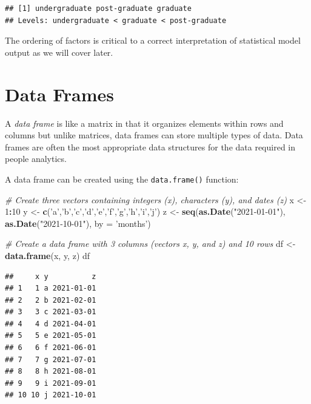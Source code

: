 \documentclass[]{book}
\newenvironment{Shaded}{\begin{snugshade}}{\end{snugshade}}
\newcommand{\CommentTok}[1]{\textcolor[rgb]{0.56,0.35,0.01}{\textit{#1}}}
\newcommand{\DataTypeTok}[1]{\textcolor[rgb]{0.13,0.29,0.53}{#1}}
\newcommand{\DecValTok}[1]{\textcolor[rgb]{0.00,0.00,0.81}{#1}}
\newcommand{\KeywordTok}[1]{\textcolor[rgb]{0.13,0.29,0.53}{\textbf{#1}}}
\newcommand{\NormalTok}[1]{#1}
\newcommand{\OperatorTok}[1]{\textcolor[rgb]{0.81,0.36,0.00}{\textbf{#1}}}
\newcommand{\StringTok}[1]{\textcolor[rgb]{0.31,0.60,0.02}{#1}}
\begin{document}
\begin{verbatim}
## [1] undergraduate post-graduate graduate     
## Levels: undergraduate < graduate < post-graduate
\end{verbatim}

The ordering of factors is critical to a correct interpretation of statistical model output as we will cover later.

\hypertarget{data-frames}{%
\section{Data Frames}\label{data-frames}}

A \emph{data frame} is like a matrix in that it organizes elements within rows and columns but unlike matrices, data frames can store multiple types of data. Data frames are often the most appropriate data structures for the data required in people analytics.

A data frame can be created using the \texttt{data.frame()} function:

\begin{Shaded}
\begin{Highlighting}[]
\CommentTok{# Create three vectors containing integers (x), characters (y), and dates (z)}
\NormalTok{x <-}\StringTok{ }\DecValTok{1}\OperatorTok{:}\DecValTok{10}
\NormalTok{y <-}\StringTok{ }\KeywordTok{c}\NormalTok{(}\StringTok{'a'}\NormalTok{,}\StringTok{'b'}\NormalTok{,}\StringTok{'c'}\NormalTok{,}\StringTok{'d'}\NormalTok{,}\StringTok{'e'}\NormalTok{,}\StringTok{'f'}\NormalTok{,}\StringTok{'g'}\NormalTok{,}\StringTok{'h'}\NormalTok{,}\StringTok{'i'}\NormalTok{,}\StringTok{'j'}\NormalTok{)}
\NormalTok{z <-}\StringTok{ }\KeywordTok{seq}\NormalTok{(}\KeywordTok{as.Date}\NormalTok{(}\StringTok{"2021-01-01"}\NormalTok{), }\KeywordTok{as.Date}\NormalTok{(}\StringTok{"2021-10-01"}\NormalTok{), }\DataTypeTok{by =} \StringTok{'months'}\NormalTok{)}

\CommentTok{# Create a data frame with 3 columns (vectors x, y, and z) and 10 rows}
\NormalTok{df <-}\StringTok{ }\KeywordTok{data.frame}\NormalTok{(x, y, z)}
\NormalTok{df}
\end{Highlighting}
\end{Shaded}

\begin{verbatim}
##     x y          z
## 1   1 a 2021-01-01
## 2   2 b 2021-02-01
## 3   3 c 2021-03-01
## 4   4 d 2021-04-01
## 5   5 e 2021-05-01
## 6   6 f 2021-06-01
## 7   7 g 2021-07-01
## 8   8 h 2021-08-01
## 9   9 i 2021-09-01
## 10 10 j 2021-10-01
\end{verbatim}
\end{document}
